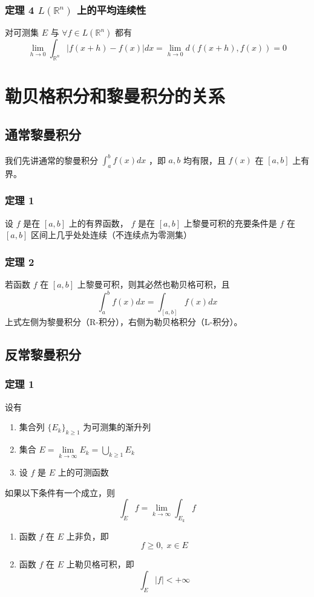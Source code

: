 \documentclass{ctexbook}
\newcommand{\R}{\mathbb{R}}
\newcommand{\ITEMS}{\begin{enumerate}[leftmargin=4em]}
\newcommand{\ITEME}{\end{enumerate}}
\begin{document}
\subsubsection{定理 4  $L(\R^n)$ 上的平均连续性}

对可测集 $E$ 与 $\forall f\in L(\R^n)$ 都有
\[	\lim_{h\to0} \int_{\R^n} \lvert f(x+h) - f(x) \rvert dx =\lim_{h\to0} d( f(x+h) , f(x) )= 0 \]

\section{勒贝格积分和黎曼积分的关系}

\subsection{通常黎曼积分}

我们先讲通常的黎曼积分 $\int_a^b f(x) dx$ ，即 $a,b$ 均有限，且 $f(x)$ 在 $[a,b]$ 上有界。

\subsubsection{定理 1}

设 $f$ 是在 $[a,b]$ 上的有界函数， $f$ 是在 $[a,b]$ 上黎曼可积的充要条件是 $f$ 在 $[a,b]$ 区间上几乎处处连续（不连续点为零测集）

\subsubsection{定理 2}

若函数 $f$ 在 $[a,b]$ 上黎曼可积，则其必然也勒贝格可积，且
\[
	\int_a^b f(x) dx = \int_{[a,b]} f(x) dx
\]
上式左侧为黎曼积分（R-积分），右侧为勒贝格积分（L-积分）。
\subsection{反常黎曼积分}

\subsubsection{定理 1}
设有
\ITEMS 
	\item 集合列 $\{E_k\}_{k\ge 1}$ 为可测集的渐升列
	\item 集合 $E = \lim\limits_{k\to\infty} E_k = \bigcup\limits_{k\ge 1} E_k$
	\item 设 $f$ 是 $E$ 上的可测函数
\ITEME
如果以下条件有一个成立，则
\[
	\int_E f = \lim_{k\to\infty} \int_{E_k} f
\]
\ITEMS 
	\item 函数 $f$ 在 $E$ 上非负，即
	\[
		f \ge 0 ,\;x\in E
	\]
	\item 函数 $f$ 在 $E$ 上勒贝格可积，即
	\[
		\int_E |f| < +\infty
	\]
\ITEME
\end{document}
